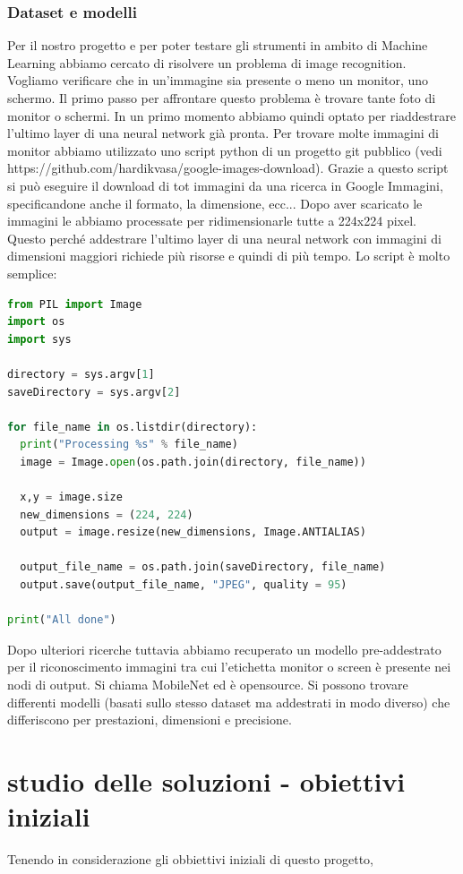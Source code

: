 \documentclass[twoside]{supsistudent}
\begin{document}
\subsubsection{Dataset e modelli}%
Per il nostro progetto e per poter testare gli strumenti in ambito di Machine Learning abbiamo cercato di risolvere un problema di image recognition. Vogliamo verificare che in un'immagine sia presente o meno un monitor, uno schermo. Il primo passo per affrontare questo problema è trovare tante foto di monitor o schermi. In un primo momento abbiamo quindi optato per riaddestrare l'ultimo layer di una neural network già pronta. 
Per trovare molte immagini di monitor abbiamo utilizzato uno script python di un progetto git pubblico (vedi https://github.com/hardikvasa/google-images-download). Grazie a questo script si può eseguire il download di tot immagini da una ricerca in Google Immagini, specificandone anche il formato, la dimensione, ecc... Dopo aver scaricato le immagini le abbiamo processate per ridimensionarle tutte a 224x224 pixel. Questo perché addestrare l'ultimo layer di una neural network con immagini di dimensioni maggiori richiede più risorse e quindi di più tempo. Lo script è molto semplice:
\begin{lstlisting}[language=Python]
from PIL import Image
import os
import sys

directory = sys.argv[1]
saveDirectory = sys.argv[2]

for file_name in os.listdir(directory):
  print("Processing %s" % file_name)
  image = Image.open(os.path.join(directory, file_name))

  x,y = image.size
  new_dimensions = (224, 224)
  output = image.resize(new_dimensions, Image.ANTIALIAS)

  output_file_name = os.path.join(saveDirectory, file_name)
  output.save(output_file_name, "JPEG", quality = 95)

print("All done")
\end{lstlisting}

Dopo ulteriori ricerche tuttavia abbiamo recuperato un modello pre-addestrato per il riconoscimento immagini tra cui l'etichetta monitor o screen è presente nei nodi di output. Si chiama MobileNet ed è opensource. Si possono trovare differenti modelli (basati sullo stesso dataset ma addestrati in modo diverso) che differiscono per prestazioni, dimensioni e precisione.

\section{studio delle soluzioni - obiettivi iniziali}
Tenendo in considerazione gli obbiettivi iniziali di questo progetto,
\end{document}
